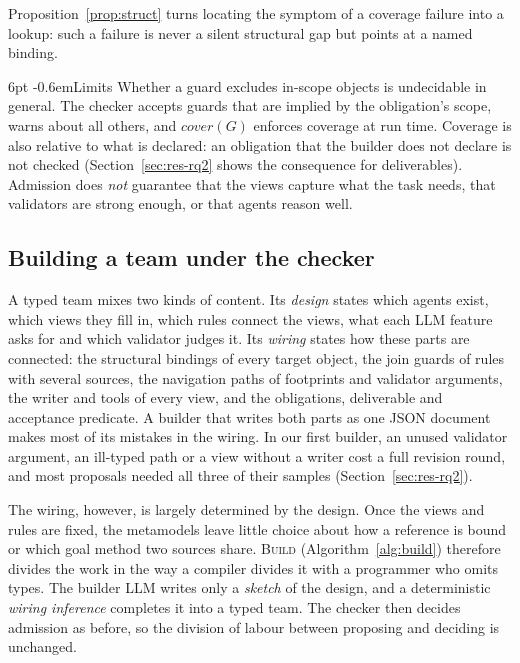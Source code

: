 \documentclass[pdflatex,sn-mathphys-num]{sn-jnl}
\makeatletter
\theoremstyle{thmstyleone}%
\theoremstyle{thmstyletwo}%
\theoremstyle{thmstylethree}%
\renewcommand\paragraph{\@startsection{paragraph}{4}{\z@}%
  {6pt \@plus 2pt \@minus 1pt}{-0.6em}{\normalfont\normalsize\bfseries}}
\makeatother
\begin{document}
Proposition~\ref{prop:struct} turns locating the symptom of a coverage failure
into a lookup: such a failure is never a silent structural gap but points at a
named binding.

\paragraph{Limits} Whether a guard excludes in-scope objects is undecidable in
general. The checker accepts guards that are implied by the obligation's scope,
warns about all others, and $\mathit{cover}(G)$ enforces coverage at run time.
Coverage is also relative to what is declared: an obligation that the builder
does not declare is not checked (Section~\ref{sec:res-rq2} shows the
consequence for deliverables). Admission does \emph{not} guarantee that the
views capture what the task needs, that validators are strong enough, or that
agents reason well.

\subsection{Building a team under the checker}\label{sec:app-build}

A typed team mixes two kinds of content. Its \emph{design} states which agents
exist, which views they fill in, which rules connect the views, what each LLM
feature asks for and which validator judges it. Its \emph{wiring} states how
these parts are connected: the structural bindings of every target object, the
join guards of rules with several sources, the navigation paths of footprints
and validator arguments, the writer and tools of every view, and the
obligations, deliverable and acceptance predicate. A builder that writes both
parts as one JSON document makes most of its mistakes in the wiring. In our
first builder, an unused validator argument, an ill-typed path or a view
without a writer cost a full revision round, and most proposals needed all
three of their samples (Section~\ref{sec:res-rq2}).

The wiring, however, is largely determined by the design. Once the views and
rules are fixed, the metamodels leave little choice about how a reference is
bound or which goal method two sources share. \textsc{Build}
(Algorithm~\ref{alg:build}) therefore divides the work in the way a compiler
divides it with a programmer who omits types. The builder LLM writes only a
\emph{sketch} of the design, and a deterministic \emph{wiring inference}
completes it into a typed team. The checker then decides admission as before,
so the division of labour between proposing and deciding is unchanged.
\end{document}

